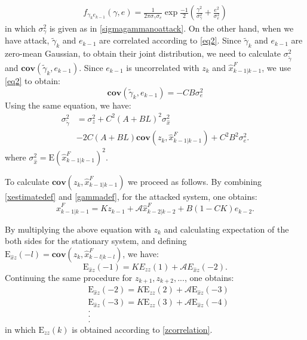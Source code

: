 \documentclass[journal,10pt]{IEEEtran}
\def\no{\nonumber}
\begin{document}
\begin{eqnarray}
f_{\gamma_{k}e_{k-1}}(\gamma,e)=\frac{1}{2\pi
\sigma_{\gamma}\sigma_{e}}\exp\frac{-1}{2}(\frac{\gamma^{2}}{\sigma_{\gamma}^{2}}+\frac{e^{2}}{\sigma_{e}^{2}})\label{noattackdis}
\end{eqnarray}
in which $\sigma_{\gamma}^{2}$ is given as in
\eqref{sigmagammanoattack}. On the other hand, when we have attack,
$\tilde{\gamma}_{k}$ and $e_{k-1}$ are correlated according to
\eqref{eq2}. Since $\tilde{\gamma}_{k}$ and $e_{k-1}$ are zero-mean
Gaussian, to obtain their joint distribution, we need to calculate
$\sigma_{\tilde{\gamma}}^{2}$ and
$\textbf{cov}(\tilde{\gamma}_{k},e_{k-1})$. Since $e_{k-1}$ is
uncorrelated with $z_{k}$ and $\hat{x}^F_{k-1|k-1}$, we use \eqref{eq2} to
obtain:
\begin{equation}
\textbf{cov}(\tilde{\gamma}_{k},e_{k-1})=-CB\sigma_{e}^{2}\label{eq7}
\end{equation}
Using the same equation, we have:
\begin{align}
\sigma_{\tilde{\gamma}}^{2} &=\sigma_{z}^{2}+C^{2}(A+BL)^{2}\sigma_{\hat{x}}^{2} 
\nonumber \\
& -2C(A+BL)\textbf{cov}(z_{k},\hat{x}^F_{k-1|k-1})
+C^{2}B^{2}\sigma_{e}^{2}.\label{eq6}
\end{align}
where $\sigma_{\hat{x}}^{2} = \mathrm{E}\left(\hat{x}^F_{k-1|k-1}\right)^2$. 

To calculate $\textbf{cov}(z_{k},\hat{x}^F_{k-1|k-1})$ we proceed as
follows. By combining \eqref{xestimatedef} and \eqref{gammadef}, for
the attacked system, one obtains:
\begin{equation}
\hat{x}^F_{k-1|k-1}=Kz_{k-1}+\mathcal{A}\hat{x}^F_{k-2|k-2}+B(1-CK)e_{k-2}.\label{eq3}
\end{equation}

By multiplying the above equation with $z_{k}$ and calculating
expectation of the both sides for the stationary system, and defining $\mathrm{E}_{\hat{x}z}(-l) = 
\textbf{cov}(z_{k},\hat{x}^F_{k-l|k-l})$,
we have:
\begin{equation}
\mathrm{E}_{\hat{x}z}(-1)=KE_{zz}(1)+\mathcal{A}E_{\hat{x}z}(-2).\no
\end{equation}
Continuing the same procedure for $z_{k+1},z_{k+2},...$, one
obtains:
\begin{eqnarray}
&\mathrm{E}_{\hat{x}z}(-2)=K\mathrm{E}_{zz}(2)+\mathcal{A}\mathrm{E}_{\hat{x}z}(-3)\no\\
&\mathrm{E}_{\hat{x}z}(-3)=K\mathrm{E}_{zz}(3)+\mathcal{A}\mathrm{E}_{\hat{x}z}(-4)\no\\
&.\no\\
&.\no\\
&.\no
\end{eqnarray}
in which $\mathrm{E}_{zz}(k)$ is obtained according to
\eqref{zcorrelation}.
\end{document}
